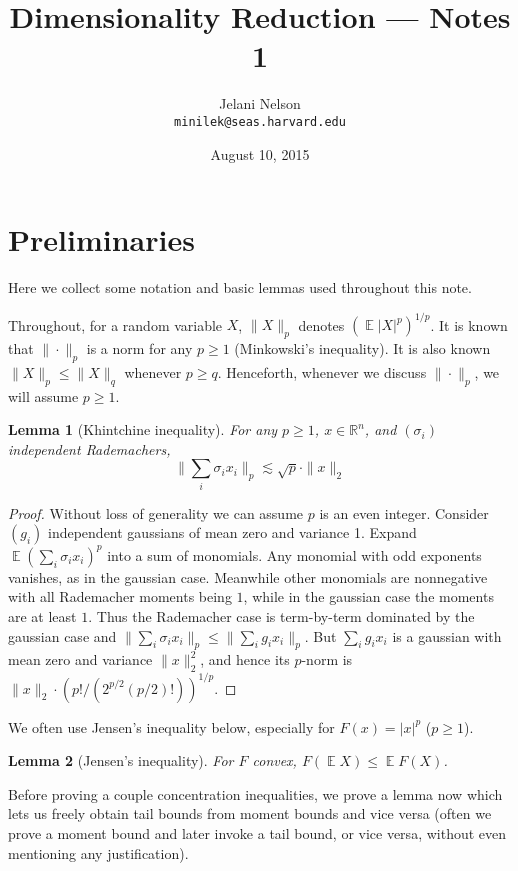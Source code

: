 \documentclass[12pt]{article}
\author{Jelani Nelson\\{}\texttt{minilek@seas.harvard.edu}}
\title{Dimensionality Reduction --- Notes 1}
\date{August 10, 2015}
\DeclareMathOperator*{\E}{\mathbb{E}}
\newcommand{\R}{\mathbb{R}}
\newtheorem{lemma}{Lemma}
\begin{document}
\maketitle

\section{Preliminaries}

Here we collect some notation and basic lemmas used throughout this note.

Throughout, for a random variable $X$, $\|X\|_p$ denotes $(\E|X|^p)^{1/p}$.
It is known that $\|\cdot\|_p$ is a norm for any $p\ge 1$ (Minkowski's inequality).
It is also known $\|X\|_p \le \|X\|_q$ whenever $p\geq q$. Henceforth, whenever we discuss $\|\cdot\|_p$, we will assume $p\ge 1$.

\begin{lemma}[Khintchine inequality]
For any $p\ge 1$, $x\in\R^n$, and $(\sigma_i)$ independent Rademachers,
$$
\|\sum_i \sigma_i x_i\|_p \lesssim \sqrt{p}\cdot \|x\|_2
$$
\end{lemma}
\begin{proof}
  Without loss of generality we can assume $p$ is an even integer. Consider $(g_i)$ independent gaussians of mean zero and variance 1. Expand $\E (\sum_i \sigma_i x_i)^p$ into a sum of monomials. Any monomial with odd exponents vanishes, as in the gaussian case. Meanwhile other monomials are nonnegative with all Rademacher moments being $1$, while in the gaussian case the moments are at least $1$. Thus the Rademacher case is term-by-term dominated by the gaussian case and $\|\sum_i \sigma_i x_i\|_p \le \|\sum_i g_i x_i\|_p$. But $\sum_i g_i x_i$ is a gaussian with mean zero and variance $\|x\|_2^2$, and hence its $p$-norm is $\|x\|_2 \cdot (p! / (2^{p/2} (p/2)!))^{1/p}$.
\end{proof}

We often use Jensen's inequality below, especially for $F(x) = |x|^p$ ($p\ge 1$).

\begin{lemma}[Jensen's inequality]
For $F$ convex, $F(\E X) \le \E F(X)$.
\end{lemma}

Before proving a couple concentration inequalities, we prove a lemma now which lets us freely obtain tail bounds from moment bounds and vice versa (often we prove a moment bound and later invoke a tail bound, or vice versa, without even mentioning any justification).
\end{document}
